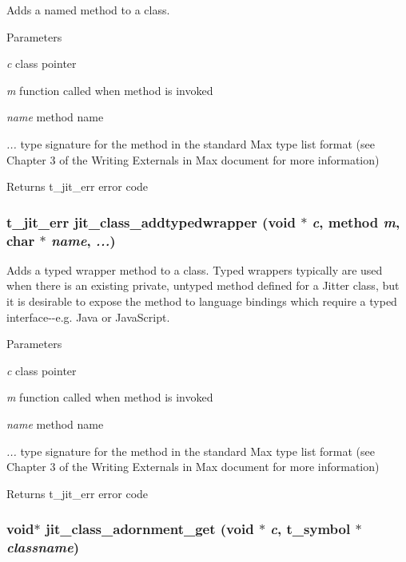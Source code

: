 Adds a named method to a class. 
\begin{DoxyParams}{Parameters}
\item[{\em c}]class pointer \item[{\em m}]function called when method is invoked \item[{\em name}]method name \item[{\em ...}]type signature for the method in the standard Max type list format (see Chapter 3 of the Writing Externals in Max document for more information)\end{DoxyParams}
\begin{DoxyReturn}{Returns}
t\_\-jit\_\-err error code 
\end{DoxyReturn}
\hypertarget{group__classmod_gac5594cb68b903b894e54ea9edb56ad61}{
\subsubsection[{jit\_\-class\_\-addtypedwrapper}]{\setlength{\rightskip}{0pt plus 5cm}t\_\-jit\_\-err jit\_\-class\_\-addtypedwrapper (void $\ast$ {\em c}, \/  {\bf method} {\em m}, \/  char $\ast$ {\em name}, \/   {\em ...})}}
\label{group__classmod_gac5594cb68b903b894e54ea9edb56ad61}


Adds a typed wrapper method to a class. Typed wrappers typically are used when there is an existing private, untyped method defined for a Jitter class, but it is desirable to expose the method to language bindings which require a typed interface-\/-\/e.g. Java or JavaScript.


\begin{DoxyParams}{Parameters}
\item[{\em c}]class pointer \item[{\em m}]function called when method is invoked \item[{\em name}]method name \item[{\em ...}]type signature for the method in the standard Max type list format (see Chapter 3 of the Writing Externals in Max document for more information)\end{DoxyParams}
\begin{DoxyReturn}{Returns}
t\_\-jit\_\-err error code 
\end{DoxyReturn}
\hypertarget{group__classmod_ga1b040b25876a0905f60683413ce34ae6}{
\subsubsection[{jit\_\-class\_\-adornment\_\-get}]{\setlength{\rightskip}{0pt plus 5cm}void$\ast$ jit\_\-class\_\-adornment\_\-get (void $\ast$ {\em c}, \/  {\bf t\_\-symbol} $\ast$ {\em classname})}}
\label{group__classmod_ga1b040b25876a0905f60683413ce34ae6}


